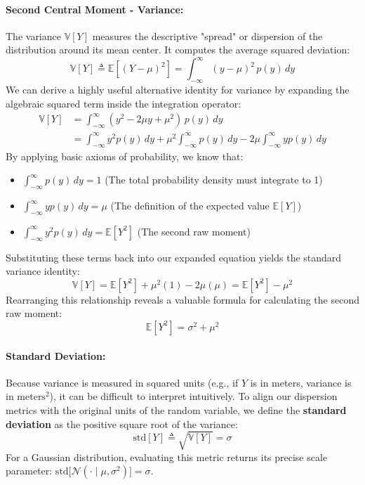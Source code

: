 \documentclass{article}
\begin{document}
\paragraph{Second Central Moment - Variance:}
The variance $\mathbb{V}[Y]$ measures the descriptive "spread" or dispersion of the distribution around its mean center. It computes the average squared deviation:
\begin{equation}
    \mathbb{V}[Y] \triangleq \mathbb{E}\left[ (Y - \mu)^2 \right] = \int_{-\infty}^{\infty} (y - \mu)^2 \, p(y) \, dy
\end{equation}
We can derive a highly useful alternative identity for variance by expanding the algebraic squared term inside the integration operator:
\begin{align}
    \mathbb{V}[Y] &= \int_{-\infty}^{\infty} (y^2 - 2\mu y + \mu^2) \, p(y) \, dy \\
    &= \int_{-\infty}^{\infty} y^2 p(y) \, dy + \mu^2 \int_{-\infty}^{\infty} p(y) \, dy - 2\mu \int_{-\infty}^{\infty} y p(y) \, dy
\end{align}
By applying basic axioms of probability, we know that:
\begin{itemize}
    \item $\int_{-\infty}^{\infty} p(y) \, dy = 1$ \quad (The total probability density must integrate to 1)
    \item $\int_{-\infty}^{\infty} y p(y) \, dy = \mu$ \quad (The definition of the expected value $\mathbb{E}[Y]$)
    \item $\int_{-\infty}^{\infty} y^2 p(y) \, dy = \mathbb{E}[Y^2]$ \quad (The second raw moment)
\end{itemize}
Substituting these terms back into our expanded equation yields the standard variance identity:
\begin{equation}
    \mathbb{V}[Y] = \mathbb{E}[Y^2] + \mu^2(1) - 2\mu(\mu) = \mathbb{E}[Y^2] - \mu^2
\end{equation}
Rearranging this relationship reveals a valuable formula for calculating the second raw moment:
\begin{equation}
    \mathbb{E}[Y^2] = \sigma^2 + \mu^2
\end{equation}

\paragraph{Standard Deviation:}
Because variance is measured in squared units (e.g., if $Y$ is in meters, variance is in $\text{meters}^2$), it can be difficult to interpret intuitively. To align our dispersion metrics with the original units of the random variable, we define the \textbf{standard deviation} as the positive square root of the variance:
\begin{equation}
    \text{std}[Y] \triangleq \sqrt{\mathbb{V}[Y]} = \sigma
\end{equation}
For a Gaussian distribution, evaluating this metric returns its precise scale parameter: $\text{std}\big[\mathcal{N}(\cdot \mid \mu, \sigma^2)\big] = \sigma$.
\end{document}
